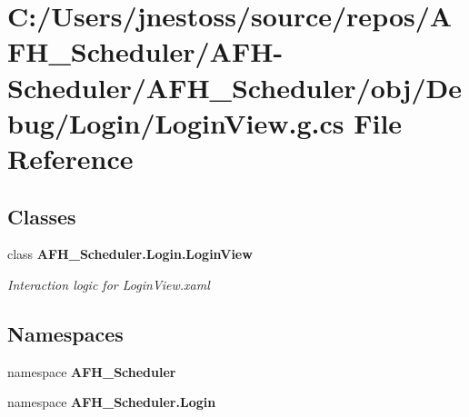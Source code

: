 \section{C\+:/\+Users/jnestoss/source/repos/\+A\+F\+H\+\_\+\+Scheduler/\+A\+F\+H-\/\+Scheduler/\+A\+F\+H\+\_\+\+Scheduler/obj/\+Debug/\+Login/\+Login\+View.g.\+cs File Reference}
\label{_debug_2_login_2_login_view_8g_8cs}
\subsection*{Classes}
\begin{DoxyCompactItemize}
\item 
class \textbf{ A\+F\+H\+\_\+\+Scheduler.\+Login.\+Login\+View}
\begin{DoxyCompactList}\small\item\em Interaction logic for Login\+View.\+xaml \end{DoxyCompactList}\end{DoxyCompactItemize}
\subsection*{Namespaces}
\begin{DoxyCompactItemize}
\item 
namespace \textbf{ A\+F\+H\+\_\+\+Scheduler}
\item 
namespace \textbf{ A\+F\+H\+\_\+\+Scheduler.\+Login}
\end{DoxyCompactItemize}
